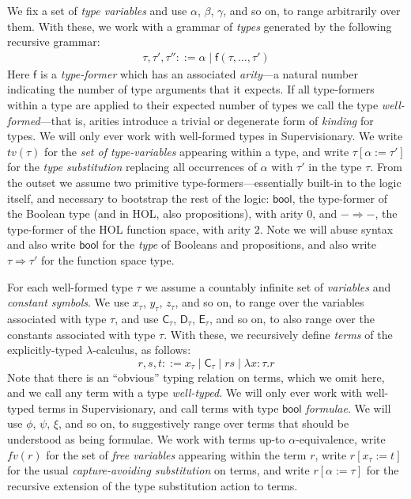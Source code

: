 \documentclass[a4paper, UKenglish, cleveref, autoref, thm-restate]{lipics-v2021}
\newcommand{\lam}[1]{\lambda{#1}.}
\begin{document}
We fix a set of \emph{type variables} and use $\alpha$, $\beta$, $\gamma$, and so on, to range arbitrarily over them.
With these, we work with a grammar of \emph{types} generated by the following recursive grammar:
\begin{gather*}
\tau, \tau', \tau'' ::= \alpha \mid \mathsf{f}(\tau, \ldots, \tau')
\end{gather*}
Here $\mathsf{f}$ is a \emph{type-former} which has an associated \emph{arity}---a natural number indicating the number of type arguments that it expects.
If all type-formers within a type are applied to their expected number of types we call the type \emph{well-formed}---that is, arities introduce a trivial or degenerate form of \emph{kinding} for types.
We will only ever work with well-formed types in Supervisionary.
We write $tv(\tau)$ for the \emph{set of type-variables} appearing within a type, and write $\tau[\alpha := \tau']$ for the \emph{type substitution} replacing all occurrences of $\alpha$ with $\tau'$ in the type $\tau$.
From the outset we assume two primitive type-formers---essentially built-in to the logic itself, and necessary to bootstrap the rest of the logic: $\mathsf{bool}$, the type-former of the Boolean type (and in HOL, also propositions), with arity $0$, and $- \Rightarrow -$, the type-former of the HOL function space, with arity $2$.
Note we will abuse syntax and also write $\mathsf{bool}$ for the \emph{type} of Booleans and propositions, and also write $\tau \Rightarrow \tau'$ for the function space type.

For each well-formed type $\tau$ we assume a countably infinite set of \emph{variables} and \emph{constant symbols}.
We use $x_\tau$, $y_\tau$, $z_\tau$, and so on, to range over the variables associated with type $\tau$, and use $\mathsf{C}_\tau$, $\mathsf{D}_\tau$, $\mathsf{E}_\tau$, and so on, to also range over the constants associated with type $\tau$.
With these, we recursively define \emph{terms} of the explicitly-typed $\lambda$-calculus, as follows:
\begin{displaymath}
r, s, t ::= x_\tau \mid \mathsf{C}_\tau \mid rs \mid \lam{x{:}\tau}r
\end{displaymath}
Note that there is an ``obvious'' typing relation on terms, which we omit here, and we call any term with a type \emph{well-typed}.
We will only ever work with well-typed terms in Supervisionary, and call terms with type $\mathsf{bool}$ \emph{formulae}.
We will use $\phi$, $\psi$, $\xi$, and so on, to suggestively range over terms that should be understood as being formulae.
We work with terms up-to $\alpha$-equivalence, write $fv(r)$ for the set of \emph{free variables} appearing within the term $r$, write $r[x_\tau := t]$ for the usual \emph{capture-avoiding substitution} on terms, and write $r[\alpha := \tau]$ for the recursive extension of the type substitution action to terms.
\end{document}
